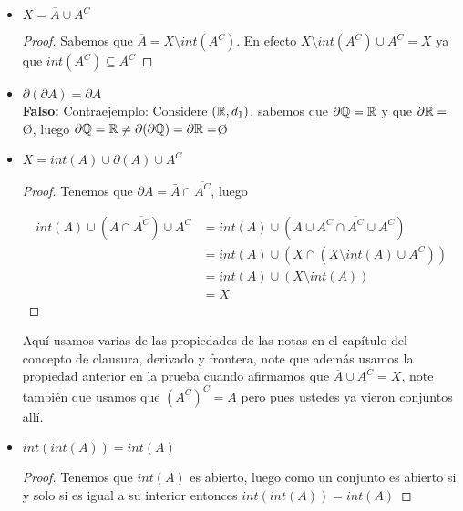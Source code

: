 \begin{itemize}[label={☠},leftmargin=*]
\item $X=\overline{A}\cup A^{C}$\\

\begin{proof}
Sabemos que $\overline{A}=X\setminus int(A^C)$. En efecto $X\setminus int(A^C)\cup A^C=X$ ya que $int(A^C)\subseteq A^C$
\end{proof}
 
\item $\partial(\partial A)=\partial A$\\

\textbf{Falso:} Contraejemplo: Considere $(\mathbb{R},d_1)$, sabemos que $\partial \mathbb{Q}=\mathbb{R}$ y que $\partial \mathbb{R}= $\O, luego $\partial \mathbb{Q}=\mathbb{R}\neq\partial(\partial \mathbb{Q})=\partial \mathbb{R}=$\O

\item $X=int(A)\cup \partial(A) \cup A^C$\\

\begin{proof}
Tenemos que $\partial A=\bar{A} \cap \overline{A^C}$, luego

\begin{align*}
int(A)\cup (\overline{A}\cap \overline{A^C}) \cup A^C&=int(A)\cup (\overline{A}\cup A^C\cap \overline{A^C}\cup A^C)\\
&=int(A)\cup (X\cap (X\setminus int(A)\cup A^C))\\
&=int(A)\cup (X\setminus int(A))\\
&=X
\end{align*}
\end{proof}

\begin{note}
Aquí usamos varias de las propiedades de las notas en el capítulo del concepto de clausura, derivado y frontera, note que además usamos la propiedad anterior en la prueba cuando afirmamos que $\overline{A}\cup A^C=X$, note también que usamos que $(A^C)^C=A$ pero pues ustedes ya vieron conjuntos allí.
\end{note}

\item $int(int(A))=int(A)$\\

\begin{proof}
 Tenemos que $int(A)$ es abierto, luego como un conjunto es abierto si y solo si es igual a su interior entonces $int(int(A))=int(A)$
\end{proof}



\end{itemize}
